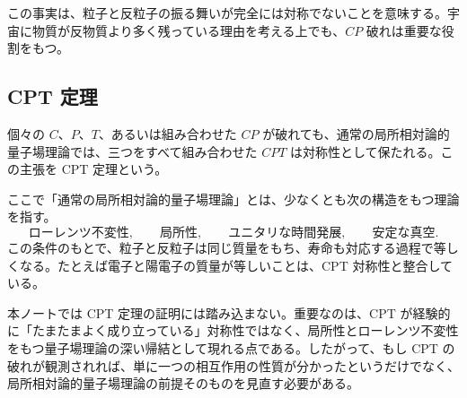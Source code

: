 この事実は、粒子と反粒子の振る舞いが完全には対称でないことを意味する。宇宙に物質が反物質より多く残っている理由を考える上でも、$CP$ 破れは重要な役割をもつ。

\subsection{CPT 定理}
個々の $C$、$P$、$T$、あるいは組み合わせた $CP$ が破れても、通常の局所相対論的量子場理論では、三つをすべて組み合わせた $CPT$ は対称性として保たれる。この主張を CPT 定理という。

ここで「通常の局所相対論的量子場理論」とは、少なくとも次の構造をもつ理論を指す。
\[
\text{ローレンツ不変性},
\qquad
\text{局所性},
\qquad
\text{ユニタリな時間発展},
\qquad
\text{安定な真空}.
\]
この条件のもとで、粒子と反粒子は同じ質量をもち、寿命も対応する過程で等しくなる。たとえば電子と陽電子の質量が等しいことは、CPT 対称性と整合している。

本ノートでは CPT 定理の証明には踏み込まない。重要なのは、CPT が経験的に「たまたまよく成り立っている」対称性ではなく、局所性とローレンツ不変性をもつ量子場理論の深い帰結として現れる点である。したがって、もし CPT の破れが観測されれば、単に一つの相互作用の性質が分かったというだけでなく、局所相対論的量子場理論の前提そのものを見直す必要がある。
